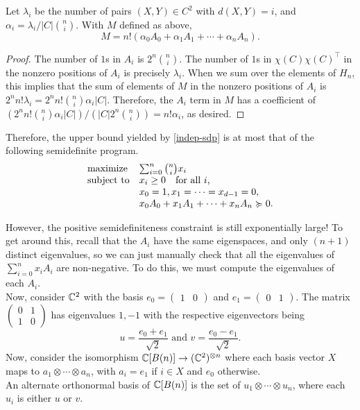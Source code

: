 	\begin{fprop}
		\label{prop:delsarte-1}
		Let $\lambda_i$ be the number of pairs $(X,Y) \in C^2$ with $d(X,Y) = i$, and $\alpha_i = \lambda_i / |C| \binom{n}{i}$.  With $M$ defined as above,
		\[ M = n! (\alpha_0 A_0 + \alpha_1 A_1 + \cdots + \alpha_n A_n).  \]
	\end{fprop}
	\begin{proof}
		The number of $1$s in $A_i$ is $2^n \binom{n}{i}$. The number of $1$s in $\chi(C)\chi(C)^\top$ in the nonzero positions of $A_i$ is precisely $\lambda_i$. When we sum over the elements of $H_n$, this implies that the sum of elements of $M$ in the nonzero positions of $A_i$ is $2^n n! \lambda_i = 2^n n! \binom{n}{i} \alpha_i |C|$. Therefore, the $A_i$ term in $M$ has a coefficient of $(2^n n! \binom{n}{i} \alpha_i |C|)/(|C| 2^n \binom{n}{i}) = n! \alpha_i$, as desired.
	\end{proof}

	Therefore, the upper bound yielded by \cref{indep-sdp} is at most that of the following semidefinite program.
	\[
		\label{indep-sdp2}
		\begin{array}{ll@{}ll}
		\text{maximize}  & \sum_{i=0}^{n} \binom{n}{i} x_i  &\\
		\text{subject to} \displaystyle & x_i \ge 0 \quad \text{for all $i$,} &\\
		& x_0 = 1, x_1 = \cdots = x_{d-1} = 0, & \\
		& x_0 A_0 + x_1 A_1 + \cdots + x_n A_n \pge 0. &
		\end{array}
	\]

	However, the positive semidefiniteness constraint is still exponentially large! To get around this, recall that the $A_i$ have the same eigenspaces, and only $(n+1)$ distinct eigenvalues, so we can just manually check that all the eigenvalues of $\sum_{i=0}^n x_i A_i$ are non-negative. To do this, we must compute the eigenvalues of each $A_i$.\\
	Now, consider $\mathbb{C}^2$ with the basis $e_0 = \begin{pmatrix} 1 & 0 \end{pmatrix}$ and $e_1 = \begin{pmatrix} 0 & 1 \end{pmatrix}$. The matrix $\begin{pmatrix} 0 & 1 \\ 1 & 0 \end{pmatrix}$ has eigenvalues $1,-1$ with the respective eigenvectors being
	\[ u = \frac{e_0 + e_1}{\sqrt{2}} \text{ and } v = \frac{e_0 - e_1}{\sqrt{2}}. \]
	Now, consider the isomorphism $\mathbb{C}[B(n)] \to (\mathbb{C}^2)^{\otimes n}$ where each basis vector $X$ maps to $a_1 \otimes \cdots \otimes a_n$, with $a_i = e_1$ if $i \in X$ and $e_0$ otherwise.\\
	An alternate orthonormal basis of $\mathbb{C}[B(n)]$ is the set of $u_1 \otimes \cdots \otimes u_n$, where each $u_i$ is either $u$ or $v$.

